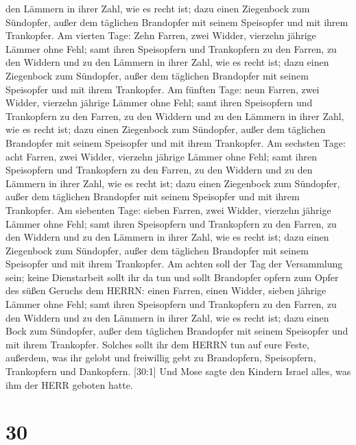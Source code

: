 den Lämmern in ihrer Zahl, wie es recht ist;  dazu einen
Ziegenbock zum Sündopfer, außer dem täglichen Brandopfer mit seinem
Speisopfer und mit ihrem Trankopfer.  Am vierten Tage: Zehn
Farren, zwei Widder, vierzehn jährige Lämmer ohne Fehl; 
samt ihren Speisopfern und Trankopfern zu den Farren, zu den Widdern und
zu den Lämmern in ihrer Zahl, wie es recht ist;  dazu einen
Ziegenbock zum Sündopfer, außer dem täglichen Brandopfer mit seinem
Speisopfer und mit ihrem Trankopfer.  Am fünften Tage: neun
Farren, zwei Widder, vierzehn jährige Lämmer ohne Fehl; 
samt ihren Speisopfern und Trankopfern zu den Farren, zu den Widdern und
zu den Lämmern in ihrer Zahl, wie es recht ist;  dazu einen
Ziegenbock zum Sündopfer, außer dem täglichen Brandopfer mit seinem
Speisopfer und mit ihrem Trankopfer.  Am sechsten Tage:
acht Farren, zwei Widder, vierzehn jährige Lämmer ohne Fehl;
 samt ihren Speisopfern und Trankopfern zu den Farren, zu
den Widdern und zu den Lämmern in ihrer Zahl, wie es recht ist;
 dazu einen Ziegenbock zum Sündopfer, außer dem täglichen
Brandopfer mit seinem Speisopfer und mit ihrem Trankopfer. 
Am siebenten Tage: sieben Farren, zwei Widder, vierzehn jährige Lämmer
ohne Fehl;  samt ihren Speisopfern und Trankopfern zu den
Farren, zu den Widdern und zu den Lämmern in ihrer Zahl, wie es recht
ist;  dazu einen Ziegenbock zum Sündopfer, außer dem
täglichen Brandopfer mit seinem Speisopfer und mit ihrem Trankopfer.
 Am achten soll der Tag der Versammlung sein; keine
Dienstarbeit sollt ihr da tun  und sollt Brandopfer opfern
zum Opfer des süßen Geruchs dem HERRN: einen Farren, einen Widder,
sieben jährige Lämmer ohne Fehl;  samt ihren Speisopfern
und Trankopfern zu den Farren, zu den Widdern und zu den Lämmern in
ihrer Zahl, wie es recht ist;  dazu einen Bock zum
Sündopfer, außer dem täglichen Brandopfer mit seinem Speisopfer und mit
ihrem Trankopfer.  Solches sollt ihr dem HERRN tun auf eure
Feste, außerdem, was ihr gelobt und freiwillig gebt zu Brandopfern,
Speisopfern, Trankopfern und Dankopfern.  {[}30:1{]} Und
Mose sagte den Kindern Israel alles, was ihm der HERR geboten hatte.

\hypertarget{section-29}{%
\section{30}\label{section-29}}


